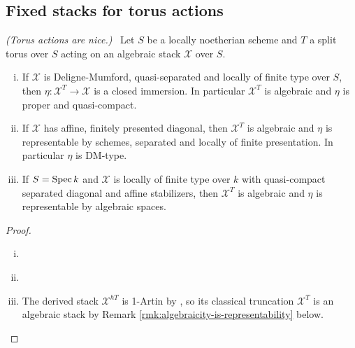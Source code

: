 \documentclass[12pt,dvipsnames]{amsart}
\begin{document}
\subsection{Fixed stacks for torus actions}
\begin{lemma}
  \label{lem:torus-actions-are-nice}
  \textit{(Torus actions are nice.)}~
  Let \(S\) be a locally noetherian scheme and \(T\) a split torus over \(S\) acting on an algebraic stack \(\mathcal X\) over \(S\).
  \begin{enumerate}[(i)]
    \item If \(\mathcal X\) is Deligne-Mumford, quasi-separated and locally of finite type over \(S\), then \(\eta:\mathcal X^T\to \mathcal X\) is a closed immersion. In particular \(\mathcal X^T\) is algebraic and \(\eta\) is proper and quasi-compact.
    \item If \(\mathcal X\) has affine, finitely presented diagonal, then \(\mathcal X^T\) is algebraic and \(\eta\) is representable by schemes, separated and locally of finite presentation. In particular \(\eta\) is DM-type.
    \item If \(S = \operatorname{Spec} k\) and \(\mathcal X\) is locally of finite type over \(k\) with quasi-compact separated diagonal and affine stabilizers, then \(\mathcal X^T\) is algebraic \cite[Thm. A.20, Rmk A.19]{aranha-khan-latyntsev-etal_VirtualLocalizationRevisited2025} and \(\eta\) is representable by algebraic spaces.
  \end{enumerate}
\end{lemma}
\begin{proof}$ $
  \begin{enumerate}[(i)]
    \item \cite[Prop A.23]{aranha-khan-latyntsev-etal_VirtualLocalizationRevisited2025}
    \item \cite[Thm 1.2.1 (1)]{romagny_AlgebraicitySmoothnessFixed2022}
          \item The derived stack \(\mathcal X^{hT}\) is 1-Artin by \cite[Thm. A.20]{aranha-khan-latyntsev-etal_VirtualLocalizationRevisited2025}, so its classical truncation \(\mathcal X^T\) is an algebraic stack by Remark \ref{rmk:algebraicity-is-representability} below.
  \end{enumerate}
\end{proof}
\end{document}
